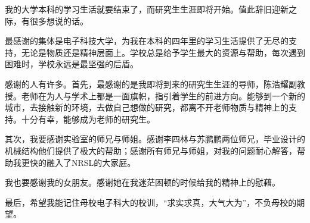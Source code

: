 
我的大学本科的学习生活就要结束了，而研究生生涯即将开始。值此辞旧迎新之际，有很多想说的话。

最感谢的集体是电子科技大学，为我在本科的四年里的学习生活提供了无尽的支持，无论是物质还是精神层面上。学校总是给予学生最大的资源与帮助，每次遇到困难时，学校永远是最坚强的后盾。

感谢的人有许多。首先，最感谢的是我即将到来的研究生生涯的导师，陈浩耀副教授。老师在为人与学术上都是一面旗帜，指引着学生的前进方向。能够到一个新的城市，去接触新的环境，去做自己想做的研究，都离不开老师物质与精神上的支持。十分有幸，能够成为老师的研究生。

其次，我要感谢实验室的师兄与师姐。感谢李四林与苏鹏鹏两位师兄，毕业设计的机械结构他们提供了极大的帮助；感谢所有师兄与师姐，对我的问题耐心解答，帮助我更快的融入了NRSL的大家庭。

我也要感谢我的女朋友。感谢她在我迷茫困顿的时候给我的精神上的慰藉。

最后，希望我能记住母校电子科大的校训，“求实求真，大气大为”，不负母校的期望。